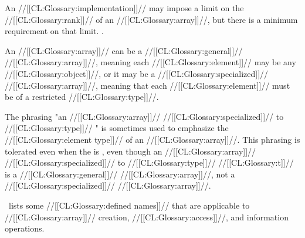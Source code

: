 
An //[[CL:Glossary:implementation]]// may impose a limit on the //[[CL:Glossary:rank]]// of an //[[CL:Glossary:array]]//, but there is a minimum requirement on that limit.  .

\endsubsubsubsubsection%

\endsubsubsubsection%

\endsubsubsection%

\endsubsection%


An //[[CL:Glossary:array]]// can be a //[[CL:Glossary:general]]// //[[CL:Glossary:array]]//, 
    meaning each //[[CL:Glossary:element]]// may be any //[[CL:Glossary:object]]//, or it may be a //[[CL:Glossary:specialized]]// //[[CL:Glossary:array]]//,
    meaning that each //[[CL:Glossary:element]]// must be of a restricted //[[CL:Glossary:type]]//.

The phrasing "an //[[CL:Glossary:array]]// //[[CL:Glossary:specialized]]// to //[[CL:Glossary:type]]// " is sometimes used to emphasize the //[[CL:Glossary:element type]]// of an //[[CL:Glossary:array]]//. This phrasing is tolerated even when the  is , even though an //[[CL:Glossary:array]]// //[[CL:Glossary:specialized]]// to //[[CL:Glossary:type]]// //[[CL:Glossary:t]]// is a //[[CL:Glossary:general]]// //[[CL:Glossary:array]]//, not a //[[CL:Glossary:specialized]]// //[[CL:Glossary:array]]//.

\Thenextfigure\ lists some //[[CL:Glossary:defined names]]// that are applicable to //[[CL:Glossary:array]]//  creation, //[[CL:Glossary:access]]//, and information operations.


 



